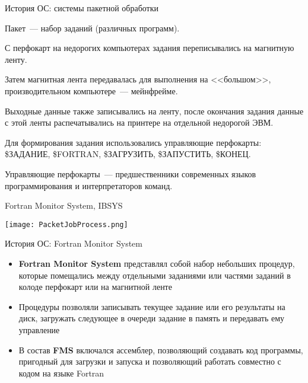 \documentclass[aspectratio=169,14pt]{beamer}
\begin{document}
\begin{frame}{История ОС: системы пакетной обработки}
    \begin{itemize}
        \begin{footnotesize}
        \begin{spacing}{0.8}
            \item Пакет~--- набор заданий (различных программ).
            \item С перфокарт на недорогих компьютерах задания переписывались
            на магнитную ленту.
            \item Затем магнитная лента передавалась для выполнения на
            <<большом>>, производительном компьютере~--- мейнфрейме.
            \item Выходные данные также записывались на ленту, после окончания
            задания данные с этой ленты распечатывались на принтере на
            отдельной недорогой ЭВМ.
            \item Для формирования задания использовались управляющие
            перфокарты: \$ЗАДАНИЕ, \$FORTRAN, \$ЗАГРУЗИТЬ, \$ЗАПУСТИТЬ, \$КОНЕЦ.
            \item Управляющие перфокарты~--- предшественники современных языков
            программирования и интерпретаторов команд.
            \item Fortran Monitor System, IBSYS
        \end{spacing}
        \end{footnotesize}
        \texttt{[image: PacketJobProcess.png]}
    \end{itemize}
\end{frame}

\begin{frame}{История ОС: Fortran Monitor System}
    \begin{itemize}
        \item \textbf{Fortran Monitor System} представлял собой набор небольших
        процедур, которые помещались между отдельными заданиями или частями
        заданий в колоде перфокарт или на магнитной ленте
        \item Процедуры позволяли записывать текущее задание или его результаты
        на диск, загружать следующее в очереди задание в память и передавать
        ему управление
        \item В состав \textbf{FMS} включался ассемблер, позволяющий создавать код
        программы, пригодный для загрузки и запуска и позволяющий работать
        совместно с кодом на языке Fortran
    \end{itemize}
\end{frame}
\end{document}
